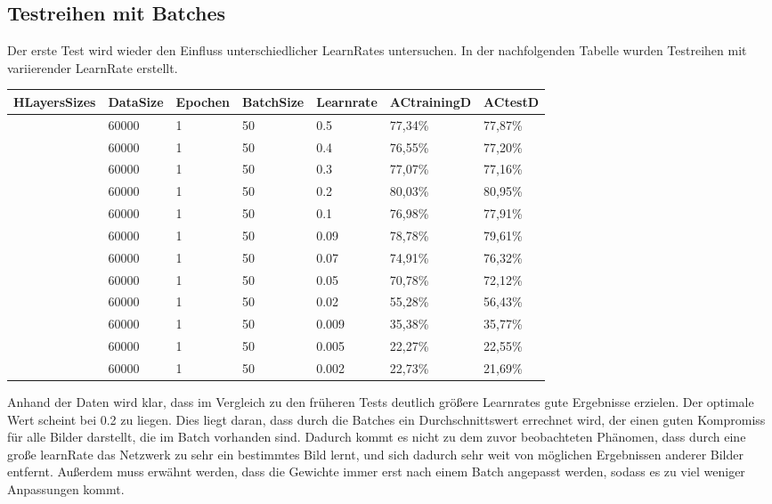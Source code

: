 \documentclass[12pt]{article}
\begin{document}
\subsection{Testreihen mit Batches}
Der erste Test wird wieder den Einfluss unterschiedlicher LearnRates untersuchen.
In der nachfolgenden Tabelle wurden Testreihen mit variierender LearnRate erstellt. 
\begin{table}[H]
    \centering
    \begin{tabular}{|l|l|l|l|l|l|l|}
    \hline
        HLayersSizes & DataSize & Epochen & BatchSize & Learnrate & ACtrainingD & ACtestD \\ \hline
        [784, 100, 10] & 60000 & 1 & 50 & 0.5 & 77,34\% & 77,87\% \\ \hline
        [784, 100, 10] & 60000 & 1 & 50 & 0.4 & 76,55\% & 77,20\% \\ \hline
        [784, 100, 10] & 60000 & 1 & 50 & 0.3 & 77,07\% & 77,16\% \\ \hline
        [784, 100, 10] & 60000 & 1 & 50 & 0.2 & 80,03\% & 80,95\% \\ \hline
        [784, 100, 10] & 60000 & 1 & 50 & 0.1 & 76,98\% & 77,91\% \\ \hline
        [784, 100, 10] & 60000 & 1 & 50 & 0.09 & 78,78\% & 79,61\% \\ \hline
        [784, 100, 10] & 60000 & 1 & 50 & 0.07 & 74,91\% & 76,32\% \\ \hline
        [784, 100, 10] & 60000 & 1 & 50 & 0.05 & 70,78\% & 72,12\% \\ \hline
        [784, 100, 10] & 60000 & 1 & 50 & 0.02 & 55,28\% & 56,43\% \\ \hline
        [784, 100, 10] & 60000 & 1 & 50 & 0.009 & 35,38\% & 35,77\% \\ \hline
        [784, 100, 10] & 60000 & 1 & 50 & 0.005 & 22,27\% & 22,55\% \\ \hline
        [784, 100, 10] & 60000 & 1 & 50 & 0.002 & 22,73\% & 21,69\% \\ \hline
    \end{tabular}
\end{table}
Anhand der Daten wird klar, dass im Vergleich zu den früheren Tests deutlich größere Learnrates gute Ergebnisse erzielen. Der optimale Wert scheint bei 0.2 zu liegen. Dies liegt daran, dass durch die Batches ein Durchschnittswert errechnet wird, der einen guten Kompromiss für alle Bilder darstellt, die im Batch vorhanden sind. Dadurch kommt es nicht zu dem zuvor beobachteten Phänomen, dass durch eine große learnRate das Netzwerk zu sehr ein bestimmtes Bild lernt, und sich dadurch sehr weit von möglichen Ergebnissen anderer Bilder entfernt. Außerdem muss erwähnt werden, dass die Gewichte immer erst nach einem Batch angepasst werden, sodass es zu viel weniger Anpassungen kommt. 
\end{document}
